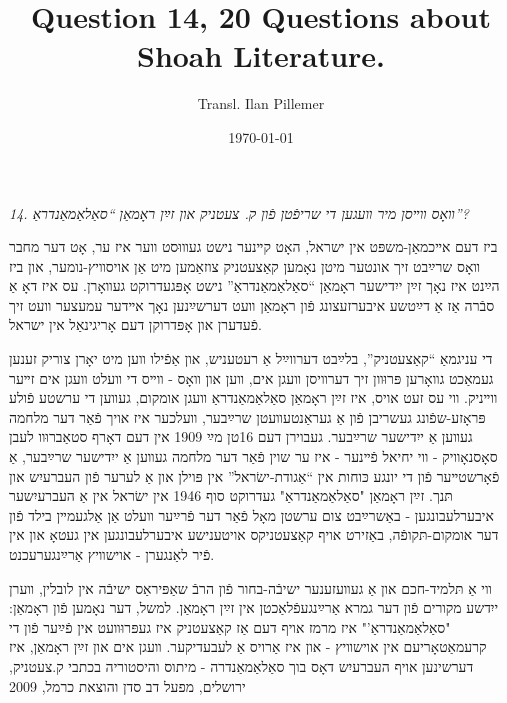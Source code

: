 \documentclass{article}
\begin{document}
\renewcommand{\abstractname}{\vspace{-\baselineskip}}
\title{Question 14, 20 Questions about Shoah Literature.}
\author{Transl. Ilan Pillemer}
\date{\today}

\maketitle
{}
\newline

\begin{pairs}

\begin{Rightside}

\begin{RTL}
\begin{hebrew}
\beginnumbering
\autopar
\emph{
14.
װאָס װײסן מיר װעגען די שריפֿטן פֿון ק. צעטניק און זײַן ראָמאַן ``סאַלאַמאַנדראַ''?
}
\newline

ביז דעם אײכמאַן-משפּט אין ישראל, האָט קײנער נישט געװוּסט װער איז ער, אָט דער מחבר װאָס שרײַבט זיך אונטער מיטן נאָמען קאַצעטניק צוזאַמען מיט אַן אויסװיץ-נומער,
און ביז הײַנט איז נאָך זײַן ייִדישער ראָמאַן ``סאַלאַמאַנדראַ'' נישט אָפּגעדרוקט געװאָרן.
עס איז דאָ אַ סבֿרה אַז אַ דײַטשע איבערזעצונג פֿון ראָמאַן װעט דערשײַנען נאָך אײדער עמעצער װעט זיך פֿעדערן און אָפּדרוקן דעם אָריגינאַל אין ישראל.


די עניגמאַ ``קאַצעטניק'', בלײַבט דערװײַל אַ רעטעניש, און אַפֿילו װען מיט יאָרן צוריק זענען געמאַכט גװאָרען פּרוּװן זיך דערװיסן װעגן אים, װען און װאָס -
װײס די װעלט װעגן אים זײער װײניק.
װי עס זעט אויס, איז זײַן ראָמאַן סאַלאַמאַנדראַ װעגן אומקום, געװען די ערשטע פֿולע פּראָזע-שפֿונג געשריבן פֿון אַ געראַנטעװעטן שרײַבער, װעלכער איז אויך פֿאַר דער מלחמה
געװען אַ ייִדישער שרײַבער. 
געבוירן דעם 16טן מײַ 1909 אין דעם דאָרף סטאַברוּװ לעבן סאָסנאָװיק -
װי יחיאל פֿײנער - איז ער שוין פֿאַר דער מלחמה געװען אַ ייִדישער שרײַבער, אַ פֿאָרשטײער פֿון די יונגע כּוחות אין ``אַגודת-ישׂראל'' אין פּוילן 
און אַ לערער פֿון העברעיִש און תּנך.
זײַן ראָמאַן "סאַלאַמאַנדראַ" געדרוקט סוף 1946 אין ישׂראל אין אַ העברעיִשער איבערלעבונגען -
באַשרײַבט צום ערשטן מאָל פֿאַר דער פֿרײַער װעלט אַן אַלגעמײן בילד פֿון דער אומקום-תּקופֿה, 
באַזירט אויף קאַצעטניקס אויטענישע איבערלעבונגען אין געטאָ און אין פֿיר לאַנגערן - אוישװיץ אַרײַנגערעכנט.


װי אַ תּלמיד-חכם און אַ געװעזענער ישיבֿה-בחור פֿון הרבֿ שאַפּיראַס ישיבֿה אין לובלין, װערן ייִדשע  מקורים פֿון דער גמרא אַרײַנגעפֿלאַכטן אין זײַן ראָמאַן.
למשל, דער נאָמען פֿון ראָמאַן: "סאַלאַמאַנדראַ'" איז מרמז אויף דעם אַז קאַצעטניק איז געפּרוּװעט אין פֿײַער פֿון די קרעמאַטאָריעם אין אוישװיץ - און 
איז אַרויס אַ לעבעדיקער. 
װעגן אים און זײַן  ראָמאַן, איז דערשינען אויף העברעיִש דאָס בוך סאַלאַמאַנדרה - מיתוס והיסטוריה בכתבי ק.צעטניק, ירושלים,  מפעל דב סדן והוצאת כרמל, 2009


\end{hebrew}
\end{RTL}
\end{Rightside}
\end{pairs}
\end{document}
